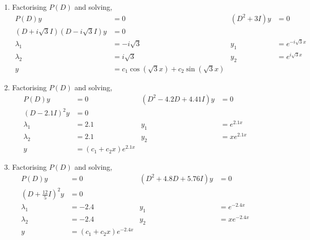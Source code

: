 \begin{enumerate}
    \item Factorising $ P(D) $ and solving,
          \begin{align}
              P(D)y                             & = 0                                           & (D^{2} + 3I)y & = 0               \\
              (D + i\sqrt{3}I)(D - i\sqrt{3}I)y & = 0                                                                               \\
              \lambda_{1}                       & = -i\sqrt{3}                                  & y_{1}         & = e^{-i\sqrt{3}x} \\
              \lambda_{2}                       & = i\sqrt{3}                                   & y_{2}         & = e^{i\sqrt{3}x}  \\
              y                                 & = c_{1}\cos(\sqrt{3}x) + c_{2}\sin(\sqrt{3}x)
          \end{align}

    \item Factorising $ P(D) $ and solving,
          \begin{align}
              P(D)y           & = 0                        & (D^{2} - 4.2D + 4.41I)y & = 0         \\
              (D - 2.1I)^{2}y & = 0                                                                \\
              \lambda_{1}     & = 2.1                      & y_{1}                   & = e^{2.1x}  \\
              \lambda_{2}     & = 2.1                      & y_{2}                   & = xe^{2.1x} \\
              y               & = (c_{1} + c_{2}x)e^{2.1x}
          \end{align}

    \item Factorising $ P(D) $ and solving,
          \begin{align}
              P(D)y                                 & = 0                         & (D^{2} + 4.8D + 5.76I)y & = 0          \\
              \left( D + \frac{12}{5}I \right)^{2}y & = 0                                                                  \\
              \lambda_{1}                           & = -2.4                      & y_{1}                   & = e^{-2.4x}  \\
              \lambda_{2}                           & = -2.4                      & y_{2}                   & = xe^{-2.4x} \\
              y                                     & = (c_{1} + c_{2}x)e^{-2.4x}
          \end{align}


\end{enumerate}
